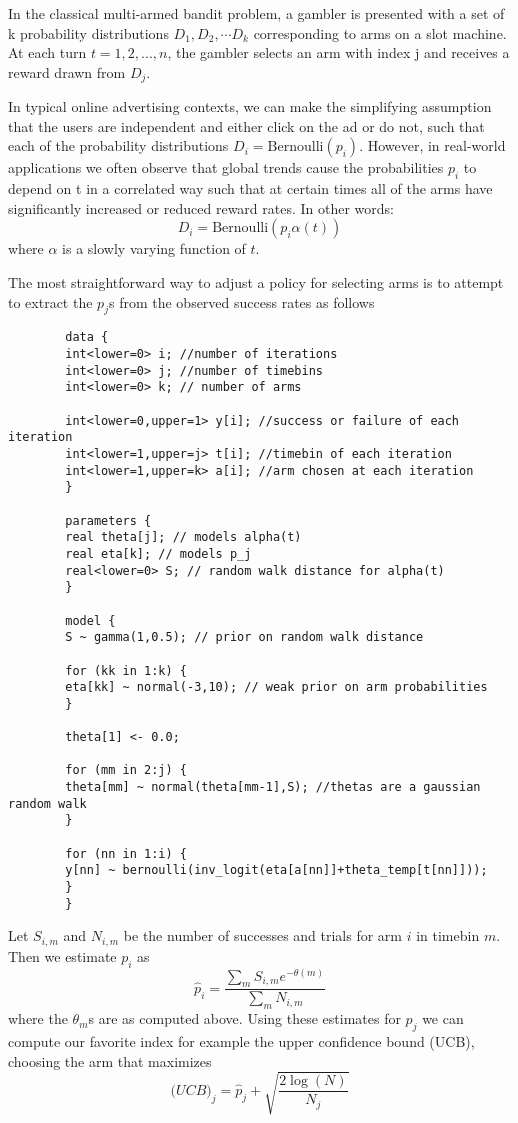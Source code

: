 \documentclass{article}
\begin{document}
In the classical multi-armed bandit problem, a gambler is presented with a set of k probability distributions ${D_1, D_2, \cdots D_k}$ corresponding to arms on a slot machine. At each turn $ t = 1, 2, ... , n$, the gambler selects an arm with index j and receives a reward drawn from $D_j$. 

In typical online advertising contexts, we can make the simplifying assumption that the users are independent and either click on the ad or do not, such that each of the probability distributions $D_i = \mathrm{Bernoulli}(p_i)$. However, in real-world applications we often observe that global trends cause the probabilities $p_i$ to depend on t in a correlated way such that at certain times all of the arms have significantly increased or reduced reward rates. In other words: 
\begin{equation}
D_i = \mathrm{Bernoulli}(p_i \alpha(t))
\end{equation}
where $\alpha$ is a slowly varying function of $t$. 

The most straightforward way to adjust a policy for selecting arms is to attempt to extract the $p_j$s from the observed success rates as follows 
\begin{verbatim}
        data { 
        int<lower=0> i; //number of iterations 
        int<lower=0> j; //number of timebins
        int<lower=0> k; // number of arms
        
        int<lower=0,upper=1> y[i]; //success or failure of each iteration
        int<lower=1,upper=j> t[i]; //timebin of each iteration
        int<lower=1,upper=k> a[i]; //arm chosen at each iteration
        }
        
        parameters {
        real theta[j]; // models alpha(t)
        real eta[k]; // models p_j
        real<lower=0> S; // random walk distance for alpha(t)
        }
               
        model {
        S ~ gamma(1,0.5); // prior on random walk distance
        
        for (kk in 1:k) {
        eta[kk] ~ normal(-3,10); // weak prior on arm probabilities 
        }
               
        theta[1] <- 0.0;
        
        for (mm in 2:j) {
        theta[mm] ~ normal(theta[mm-1],S); //thetas are a gaussian random walk 
        }        
        
        for (nn in 1:i) {
        y[nn] ~ bernoulli(inv_logit(eta[a[nn]]+theta_temp[t[nn]]));
        }
        }
\end{verbatim}  
 Let $S_{i,m}$ and $N_{i,m}$ be the number of successes and trials for arm $i$ in timebin $m$. Then we estimate $p_i$  as      
 \begin{equation}
\hat{p}_i = \frac{\sum_m S_{i,m} e^{-\theta(m)}}{\sum_m N_{i,m}}
\end{equation}
where the $\theta_m$s are as computed above. Using these estimates for $p_j$ we can compute our favorite index for example the upper confidence bound (UCB), choosing the arm that maximizes 
\begin{equation}
\mathrm(UCB)_j = \hat{p}_j + \sqrt{\frac{2 \log (N)}{N_j}}
\end{equation} 
\end{document}
